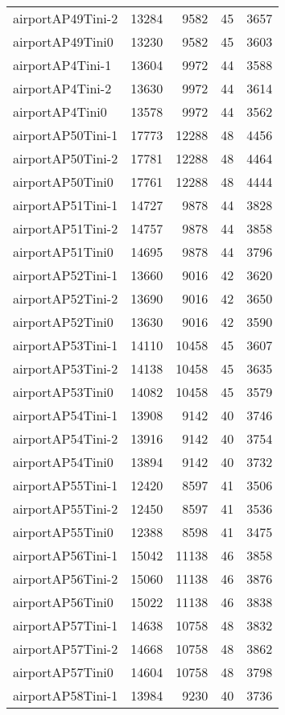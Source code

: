 \begin{longtable}{lrrrr}
airportAP49Tini-2 & 13284 & 9582 & 45 & 3657 \\
airportAP49Tini0 & 13230 & 9582 & 45 & 3603 \\
airportAP4Tini-1 & 13604 & 9972 & 44 & 3588 \\
airportAP4Tini-2 & 13630 & 9972 & 44 & 3614 \\
airportAP4Tini0 & 13578 & 9972 & 44 & 3562 \\
airportAP50Tini-1 & 17773 & 12288 & 48 & 4456 \\
airportAP50Tini-2 & 17781 & 12288 & 48 & 4464 \\
airportAP50Tini0 & 17761 & 12288 & 48 & 4444 \\
airportAP51Tini-1 & 14727 & 9878 & 44 & 3828 \\
airportAP51Tini-2 & 14757 & 9878 & 44 & 3858 \\
airportAP51Tini0 & 14695 & 9878 & 44 & 3796 \\
airportAP52Tini-1 & 13660 & 9016 & 42 & 3620 \\
airportAP52Tini-2 & 13690 & 9016 & 42 & 3650 \\
airportAP52Tini0 & 13630 & 9016 & 42 & 3590 \\
airportAP53Tini-1 & 14110 & 10458 & 45 & 3607 \\
airportAP53Tini-2 & 14138 & 10458 & 45 & 3635 \\
airportAP53Tini0 & 14082 & 10458 & 45 & 3579 \\
airportAP54Tini-1 & 13908 & 9142 & 40 & 3746 \\
airportAP54Tini-2 & 13916 & 9142 & 40 & 3754 \\
airportAP54Tini0 & 13894 & 9142 & 40 & 3732 \\
airportAP55Tini-1 & 12420 & 8597 & 41 & 3506 \\
airportAP55Tini-2 & 12450 & 8597 & 41 & 3536 \\
airportAP55Tini0 & 12388 & 8598 & 41 & 3475 \\
airportAP56Tini-1 & 15042 & 11138 & 46 & 3858 \\
airportAP56Tini-2 & 15060 & 11138 & 46 & 3876 \\
airportAP56Tini0 & 15022 & 11138 & 46 & 3838 \\
airportAP57Tini-1 & 14638 & 10758 & 48 & 3832 \\
airportAP57Tini-2 & 14668 & 10758 & 48 & 3862 \\
airportAP57Tini0 & 14604 & 10758 & 48 & 3798 \\
airportAP58Tini-1 & 13984 & 9230 & 40 & 3736 \\

\end{longtable}
